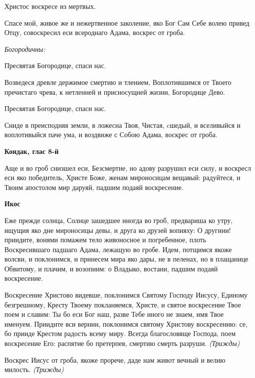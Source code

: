 Христос воскресе из мертвых.


Спасе мой, живое же и нежертвенное заколение, яко Бог Сам Себе волею привед Отцу, совоскресил еси всероднаго Адама, воскрес от гроба.


\itshape Богородичны:

\normalfont{}


Пресвятая Богородице, спаси нас.


Возведеся древле держимое смертию и тлением, Воплотившимся от Твоего пречистаго чрева, к нетленней и присносущней жизни, Богородице Дево.


Пресвятая Богородице, спаси нас.


Сниде в преисподняя земли, в ложесна Твоя, Чистая, cшедый, и вселивыйся и воплотивыйся паче ума, и воздвиже с Собою Адама, воскрес от гроба.





\bfseries Кондак, глас 8-й\normalfont{}


Аще и во гроб снизшел еси, Безсмертне, но адову разрушил еси силу, и воскресл еси яко победитель, Христе Боже, женам мироносицам вещавый: радуйтеся, и Твоим апостолом мир даруяй, падшим подаяй воскресение.





\bfseries Икос\normalfont{}


Еже прежде солнца, Солнце зашедшее иногда во гроб, предвариша ко утру, ищущия яко дне мироносицы девы, и друга ко друзей вопияху: О другини! приидите, вонями помажем тело живоносное и погребенное, плоть Воскресившаго падшаго Адама, лежащую во гробе. Идем, потщимся якоже волсви, и поклонимся, и принесем мира яко дары, не в пеленах, но в плащанице Обвитому, и плачим, и возопиим: о Владыко, востани, падшим подаяй воскресение.


Воскресение Христово видевше, поклонимся Святому Господу Иисусу, Единому безгрешному, Кресту Твоему покланяемся, Христе, и святое воскресение Твое поем и славим: Ты бо еси Бог наш, разве Тебе иного не знаем, имя Твое именуем. Приидите вси вернии, поклонимся святому Христову воскресению: се, бо прииде Крестом радость всему миру. Всегда благословяще Господа, поем воскресение Его: распятие бо претерпев, смертию смерть разруши. \itshape (Трижды)\normalfont{}


Воскрес Иисус от гроба, якоже прорече, даде нам живот вечный и велию милость. \itshape (Трижды)\normalfont{}





